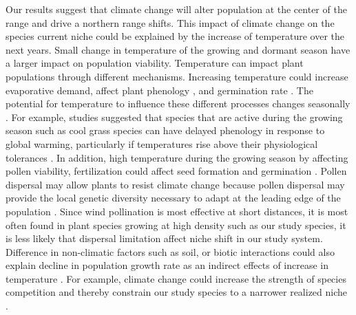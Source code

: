 \documentclass[12pt]{article}
\begin{document}
Our results suggest that climate change will alter population at the center of the range and drive a northern range shifts. 
This impact of climate change on the species current niche could be explained by the increase of temperature over the next years.
Small change in temperature of the growing and dormant season have a larger impact on population viability.
Temperature can impact plant populations through different mechanisms.
Increasing temperature could increase evaporative demand, affect plant phenology \citep{mclean2016predicting,sherry2007divergence,iler2019reproductive}, and germination rate \citep{reed2021climate}.
The potential for temperature to influence these different processes changes seasonally \citep{konapala2020climate}.
For example, studies suggested that species that are active during the growing season such as cool grass species can have delayed phenology in response to global warming, particularly if temperatures rise above their physiological tolerances \citep{cleland2007shifting, williams2015life}.
In addition, high temperature during the growing season by affecting pollen viability, fertilization could affect seed formation and germination \citep{hatfield2015temperature,sletvold2015climate}.
Pollen dispersal may allow plants to resist climate change because pollen dispersal may provide the local genetic diversity necessary to adapt at the leading edge of the population \citep{kremer2012long,corlett2013will,duputie2012genetic}.
Since wind pollination is most effective at short distances, it is most often found in plant species growing at high density such as our study species, it is less likely that dispersal limitation  affect niche shift in our study system.
Difference in non-climatic factors such as soil, or biotic interactions could also explain decline in population growth rate as an indirect effects of increase in temperature \citep{alexander2015novel,schultz2022climate}.
For example, climate change could increase the strength of species competition and thereby constrain our study species  to a narrower realized niche \citep{pulliam2000relationship,aguilee2016pollen}.
\end{document}
